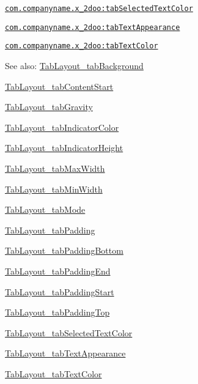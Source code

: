 {\tt \hyperlink{classandroid_1_1support_1_1v4_1_1_r_1_1styleable_7c1ab99e50a37a18c9bf0c809debb859}{com.companyname.x\_\-2doo:tabSelectedTextColor}}

{\tt \hyperlink{classandroid_1_1support_1_1v4_1_1_r_1_1styleable_411f9a9c12b8ed9f61f5cb57536ee912}{com.companyname.x\_\-2doo:tabTextAppearance}}

{\tt \hyperlink{classandroid_1_1support_1_1v4_1_1_r_1_1styleable_67777f9a649ba213b12bd3b8176c975f}{com.companyname.x\_\-2doo:tabTextColor}}

\begin{Desc}
\item[See also:]\hyperlink{classandroid_1_1support_1_1v4_1_1_r_1_1styleable_675e2f29080457fa431fc68be4479b4f}{TabLayout\_\-tabBackground} 

\hyperlink{classandroid_1_1support_1_1v4_1_1_r_1_1styleable_df711e29dcdb60bbd96c539283d0f4f1}{TabLayout\_\-tabContentStart} 

\hyperlink{classandroid_1_1support_1_1v4_1_1_r_1_1styleable_972b042e4a3fcafa9cafaf6453a759e2}{TabLayout\_\-tabGravity} 

\hyperlink{classandroid_1_1support_1_1v4_1_1_r_1_1styleable_ecd068c380384ff47f22004dc6bf860e}{TabLayout\_\-tabIndicatorColor} 

\hyperlink{classandroid_1_1support_1_1v4_1_1_r_1_1styleable_be8e5fea2ebe1b6d9d9aa4cca6549e78}{TabLayout\_\-tabIndicatorHeight} 

\hyperlink{classandroid_1_1support_1_1v4_1_1_r_1_1styleable_8e0718dd07664eb909dcf60018ef5c49}{TabLayout\_\-tabMaxWidth} 

\hyperlink{classandroid_1_1support_1_1v4_1_1_r_1_1styleable_4b4566378cac3b5013ed493236349b6d}{TabLayout\_\-tabMinWidth} 

\hyperlink{classandroid_1_1support_1_1v4_1_1_r_1_1styleable_87f917746f24bf8503296b15435b51c7}{TabLayout\_\-tabMode} 

\hyperlink{classandroid_1_1support_1_1v4_1_1_r_1_1styleable_4298aad07907a00ae8fb09582886b5c7}{TabLayout\_\-tabPadding} 

\hyperlink{classandroid_1_1support_1_1v4_1_1_r_1_1styleable_52f17fc2c908e7fc2d72f48472b4125e}{TabLayout\_\-tabPaddingBottom} 

\hyperlink{classandroid_1_1support_1_1v4_1_1_r_1_1styleable_ed971a95ce0c06adb144c8d88ab0fe8f}{TabLayout\_\-tabPaddingEnd} 

\hyperlink{classandroid_1_1support_1_1v4_1_1_r_1_1styleable_1a5292e1b40f0fa300a0dbb3286373d6}{TabLayout\_\-tabPaddingStart} 

\hyperlink{classandroid_1_1support_1_1v4_1_1_r_1_1styleable_1bbc5410da0ccdca7252583408dbbb6a}{TabLayout\_\-tabPaddingTop} 

\hyperlink{classandroid_1_1support_1_1v4_1_1_r_1_1styleable_7c1ab99e50a37a18c9bf0c809debb859}{TabLayout\_\-tabSelectedTextColor} 

\hyperlink{classandroid_1_1support_1_1v4_1_1_r_1_1styleable_411f9a9c12b8ed9f61f5cb57536ee912}{TabLayout\_\-tabTextAppearance} 

\hyperlink{classandroid_1_1support_1_1v4_1_1_r_1_1styleable_67777f9a649ba213b12bd3b8176c975f}{TabLayout\_\-tabTextColor} \end{Desc}
